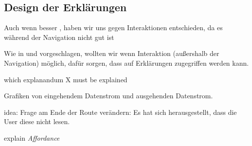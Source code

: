 \subsection{Design der Erklärungen}

Auch wenn besser \cite{riveiro_thats_2021}, haben wir uns gegen Interaktionen entschieden, da es während der Navigation nicht gut ist

Wie in \cite{chazette_end-users_nodate} und \cite{wang_integration_2020} vorgeschlagen, wollten wir wenn Interaktion (außershalb der Navigation) möglich, dafür sorgen, dass auf Erklärungen zugegriffen werden kann.

which explanandum X must be explained \cite{kohl_explainability_2019}

Grafiken von eingehendem Datenstrom und ausgehenden Datenstrom.

idea: Frage am Ende der Route verändern: Es hat sich herausgestellt, dass die User diese nicht lesen.

explain \textit{Affordance}







